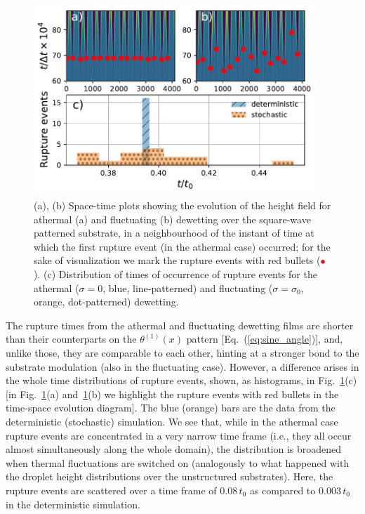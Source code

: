 \begin{figure}
    \centering
    \includegraphics[width=0.95\textwidth]{graphics/Rupture_events_with_film.pdf}
    \caption{(a), (b) Space-time plots showing the evolution of the height field for athermal (a) and fluctuating (b) dewetting over the square-wave patterned substrate, in a neighbourhood of the instant of time at which the first rupture event (in the athermal case) occurred; for the sake of visualization we mark the rupture events with red bullets (\textcolor{red}{$\bullet$}).
    (c) Distribution of times of occurrence of rupture events for the athermal ($\sigma=0$, blue, line-patterned) and fluctuating ($\sigma = \sigma_0$, orange, dot-patterned) dewetting.} 
    \label{fig:rupture_time_distri_square_wave8}
\end{figure}

The rupture times from the athermal and fluctuating dewetting films are shorter than their counterparts on the $\theta^{(1)}(x)$ pattern [Eq.~(\ref{eq:sine_angle})], and, unlike those, they are comparable to each other, hinting at a stronger bond to the substrate modulation (also in the fluctuating case).
However, a difference arises in the whole time distributions of rupture events, shown, as histograms, in Fig.~\ref{fig:rupture_time_distri_square_wave8}(c) [in Fig.~\ref{fig:rupture_time_distri_square_wave8}(a) and~\ref{fig:rupture_time_distri_square_wave8}(b) we highlight the rupture events with red bullets in the time-space evolution diagram].
The blue (orange) bars are the data from the deterministic (stochastic) simulation.
We see that, while in the athermal case rupture events are concentrated in a very narrow time frame (i.e., they all occur almost simultaneously along the whole domain), the distribution is broadened when thermal fluctuations are switched on (analogously to what happened with the droplet height distributions over the unstructured substrates).
Here, the rupture events are scattered over a time frame of $0.08\,t_0$ as compared to $0.003\,t_0$ in the deterministic simulation.

